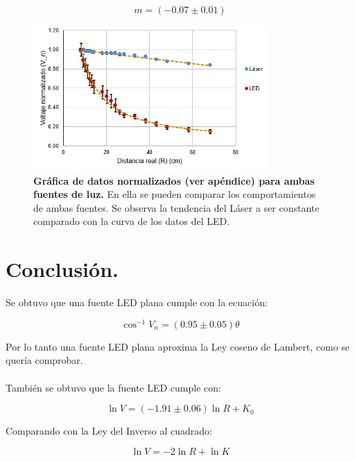 \documentclass[DIV=calc, paper=a4, fontsize=11pt]{scrartcl}
\begin{document}
\begin{equation*}
    m = (-0.07 \pm 0.01)
\end{equation*}
\begin{figure}[H]
    \centering
    \includegraphics[width=9cm]{LED y LAser.PNG}
    \caption{\textbf{Gráfica de datos normalizados (ver apéndice) para ambas fuentes de luz.} En ella se pueden comparar los comportamientos de ambas fuentes. Se observa la tendencia del Láser a ser constante comparado con la curva de los datos del LED.}
    \label{fig:my_label}
\end{figure}
\newpage
\section*{\textcolor{carmine}{Conclusión.}}
Se obtuvo que una fuente LED plana cumple con la ecuación:

\begin{equation*}
   \cos^{-1}{V_{n}}=(0.95\pm 0.05)\theta  
\end{equation*}

Por lo tanto una fuente LED plana aproxima la Ley coseno de Lambert, como se quería comprobar.
\\\\
También se obtuvo que la fuente LED cumple con:

\begin{equation*}
  \ln{V}=(-1.91\pm 0.06)\ln{R}+K_{0}
\end{equation*}


Comparando con la Ley del Inverso al cuadrado:

\begin{equation*}
   \ln{V}= -2\ln{R} + \ln{K}  
\end{equation*}
\end{document}
